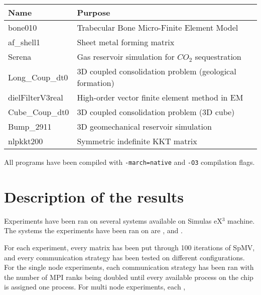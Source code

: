 \begin{table}[H]
\begin{center}
\begin{tabular}[c]{|l|l|}
\hline
\textbf{Name}&\textbf{Purpose}  \\
\hline
bone010&Trabecular Bone Micro-Finite Element Model\\
\hline
af\_shell1&Sheet metal forming matrix\\
\hline
Serena&Gas reservoir simulation for \(CO_{2}\) sequestration\\
\hline
Long\_Coup\_dt0&3D coupled consolidation problem (geological formation)\\
\hline
dielFilterV3real&High-order vector finite element method in EM\\
\hline
Cube\_Coup\_dt0&3D coupled consolidation problem (3D cube)\\
\hline
Bump\_2911&3D geomechanical reservoir simulation\\
\hline
nlpkkt200&Symmetric indefinite KKT matrix\\
\hline
\end{tabular}
\end{center}
\end{table}

All programs have been compiled with \texttt{-march=native} and \texttt{-O3} compilation flags.

\section{Description of the results}
Experiments have been ran on several systems available on Simulas eX\(^{3}\) machine. The systems the experiments have been ran on are , \romeq\phantom{a}and \fpgaq.
\medskip

For each experiment, every matrix has been put through 100 iterations of SpMV, and every communication strategy has been tested on different configurations. For the single node experiments, each communication strategy has been ran with the number of MPI ranks being doubled until every available process on the chip is assigned one process. For multi node experiments, each , 

